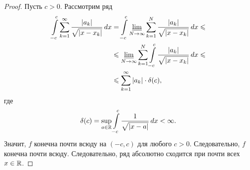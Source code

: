 \begin{proof}
 Пусть $c > 0$. Рассмотрим ряд \begin{align*}
  \int\limits_{-c}^{c} \sum_{k=1}^{\infty} \frac{\left| a_k \right|}{\sqrt{\left| x - x_k \right|}} \, dx &= \int\limits_{-c}^{c} \varliminf_{N \to \infty} \sum_{k=1}^{N} \frac{\left| a_k \right|}{\sqrt{\left| x - x_k \right|}}  \, dx  \leqslant \\ &\leqslant \varliminf_{N \to \infty} \sum_{k=1}^{N}  \int\limits_{-c}^{c} \frac{\left| a_k \right|}{\sqrt{\left| x - x_k \right|}} \, dx \leqslant \\ &\leqslant \sum_{k=1}^{\infty} \left| a_k \right| \cdot \delta(c)
 ,\end{align*} где \begin{align*}
 \delta(c) = \sup_{a \in \mathbb{R}} \int\limits_{-c}^{c} \frac{1}{\sqrt{\left| x - a \right|}}  \, dx  < \infty
 .\end{align*} Значит, $f$ конечна почти всюду на $(-c, c)$ для любого  $c > 0$. Следовательно, $f$ конечна почти всюду. Следовательно, ряд абсолютно сходится при почти всех $x \in \mathbb{R}$.
\end{proof}
